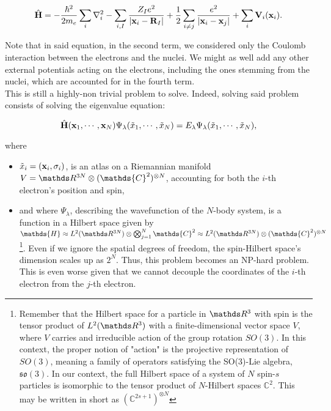 \documentclass{homework}
\begin{document}
\begin{equation}
    \hat{\bf H} = -\frac{\hbar^2}{2m_e} \sum_i \nabla^2_i - \sum_{i, I} \frac{Z_I e^2}{|{\bf x}_i - {\bf R}_I|} + \frac{1}{2} \sum_{i \neq j} \frac{e^2}{|{\bf x}_i-{\bf x}_j|} + \sum_{i} {\bf V}_i ({\bf x}_i).
\label{simplified many-body Hamiltonian}
\end{equation}

Note that in said equation, in the second term, we considered only the Coulomb interaction between the electrons and the nuclei. We might as well add any other external potentials acting on the electrons, including the ones stemming from the nuclei, which are accounted for in the fourth term. \\

This is still a highly-non trivial problem to solve. Indeed, solving said problem consists of solving the eigenvalue equation:

\begin{equation}
\hat{\bf H}({\bf x}_1, \cdots, {\bf x}_N) \Psi_\lambda(\tilde{x}_1, \cdots, \tilde{x}_N) = E_\lambda \Psi_\lambda(\tilde{x}_1, \cdots, \tilde{x}_N),
\label{ev equation}
\end{equation}

where 

\begin{itemize}
    \item $\tilde{x}_i = ({\bf x}_i, \sigma_i)$, is an atlas on a Riemannian manifold $V = \R^{3N} \otimes (\mathds{C}^2)^{\otimes N}$, accounting for both the $i$-th electron's position and spin,
    \item and where $\Psi_\lambda$, describing the wavefunction of the $N$-body system, is a function in a Hilbert space given by $\mathds{H} \approx L^2(\R^{3N}) \otimes \bigotimes_{j=1}^{N} \mathds{C}^2 \approx L^2(\R^{3N}) \otimes (\mathds{C}^{2})^{\otimes N}$\footnote{Remember that the Hilbert space for a particle in $\R^3$ with spin is the tensor product of $L^2(\R^3)$ with a finite-dimensional vector space $V$, where $V$ carries and irreducible action of the group rotation $SO(3)$. In this context, the proper notion of "action" is the projective representation of $SO(3)$, meaning a family of operators satisfying the SO(3)-Lie algebra, $\mathfrak{so}(3)$. In our context, the full Hilbert space of a system of $N$ spin-$s$ particles is isomorphic to the tensor product of $N$-Hilbert spaces $\mathds{C}^2$. This may be written in short as $(\mathds{C}^{2s+1})^{\otimes N}$}. Even if we ignore the spatial degrees of freedom, the spin-Hilbert space's dimension scales up as $2^N$. Thus, this problem becomes an NP-hard problem. This is even worse given that we cannot decouple the coordinates of the $i$-th electron from the $j$-th electron. \\ 
\end{itemize}
\end{document}
